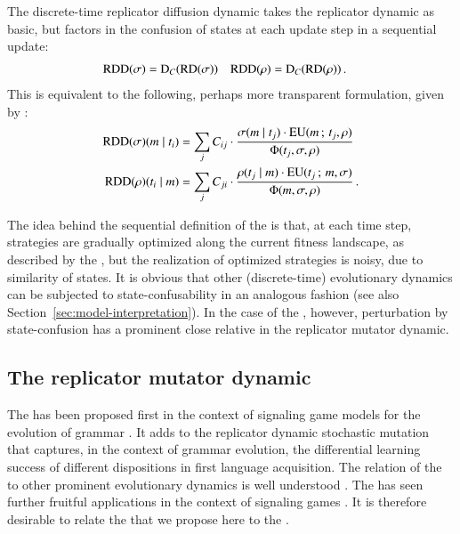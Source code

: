 The discrete-time replicator diffusion dynamic takes the replicator
dynamic as basic, but factors in the confusion of states at each
update step in a sequential update:
\begin{align*}
  \mathrm{RDD}(\sigma) & = \mathrm{D}_C(\mathrm{RD}(\sigma)) &   \mathrm{RDD}(\rho) & = \mathrm{D}_C(\mathrm{RD}(\rho)) \,.
\end{align*}
This is equivalent to the following, perhaps more transparent
formulation, given by \citet{Correia2013:The-Bivalent-Tr}:
\begin{align*}
  \mathrm{RDD}(\sigma)(m \mid t_i) & = \sum_{j} C_{ij} \cdot
  \frac{\sigma(m \mid t_j) \cdot
    \mathrm{EU}(m \thinspace ; \thinspace t_j,\rho)}
  {\Phi(t_j,\sigma, \rho)} \\
    \mathrm{RDD}(\rho)(t_i \mid m) & = \sum_{j} C_{ji} \cdot
  \frac{\rho(t_j \mid m) \cdot
    \mathrm{EU}(t_j \thinspace ; \thinspace m,\sigma)} {\Phi(m,\sigma, \rho)}  \,.
\end{align*}

The idea behind the sequential definition of the \rdd is that, at each
time step, strategies are gradually optimized along the current
fitness landscape, as described by the \rd, but the realization of
optimized strategies is noisy, due to similarity of states. It is
obvious that other (discrete-time) evolutionary dynamics can be
subjected to state-confusability in an analogous fashion (see also
Section~\ref{sec:model-interpretation}). In the case of the \rd,
however, perturbation by state-confusion has a prominent close
relative in the replicator mutator dynamic.

\subsection{The replicator mutator dynamic}
\label{sec:repl-mutat-dynam}

The \rmd has been proposed first in the context of signaling game
models for the evolution of grammar
\citep[e.g.][]{KomarovaNiyogi2001:The-Evolutionar,NowakKomarova2001:Evolution-of-Un,Nowak2006:Evolutionary-Dy}. It
adds to the replicator dynamic stochastic mutation that captures, in
the context of grammar evolution, the differential learning success of
different dispositions in first language acquisition. The relation of
the \rmd to other prominent evolutionary dynamics is well understood
\citep{PageNowak2002:Unifying-Evolut}. The \rmd has seen further
fruitful applications in the context of signaling games
\citep[e.g.][]{HutteggerSkyrms2010:Evolutionary-Dy,Deo2014:The-Semantic-an}. It
is therefore desirable to relate the \rdd that we propose here to the
\rmd.

